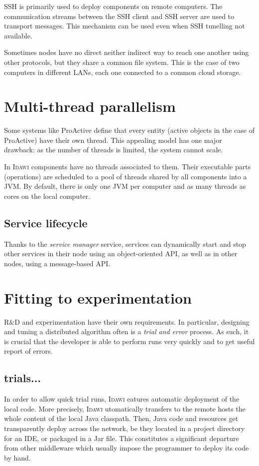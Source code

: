 \documentclass{article}
\newcommand{\idawi}[1]{\textsc{Idawi}\xspace}
\begin{document}
SSH
is primarily used to deploy components on remote computers. The communication streams between the SSH client and SSH server are used to transport messages. This mechanism can be used even when SSH tunelling not available.

Sometimes nodes have no direct neither indirect way to reach one another using other protocols, but they share a common file system. This is the case of two computers in different LANs, each one connected to a common cloud storage.


\section{Multi-thread parallelism}
Some systems like ProActive define that every entity (active objects in the case of ProActive) have their own thread. This appealing model has one major drawback: as the number of threads is limited, the system cannot scale.

In \idawi, components have no threads associated to them. Their executable parts (operations) are scheduled to a pool of threads shared by all components into a JVM. By default, there is only one JVM per computer and as many threads as cores on the local computer.

\subsection{Service lifecycle}

Thanks to the \textit{service manager} service, services can dynamically start and stop other services in their node using an object-oriented API, as well as in other nodes, using a message-based API. 



\section{Fitting to experimentation}
R\&D and experimentation have their own requirements. In particular, designing and tuning a distributed algorithm often is a {\em trial and error} process. As such, it is crucial that the developer is able to perform runs very quickly and to get useful report of errors. 

\subsection{trials...}
In order to allow quick trial runs, \idawi features automatic deployment of the local code.  More precisely, \idawi automatically transfers to the remote hosts the whole content of the local Java classpath. Then, Java code and resources get  transparently deploy across the network, be they located in a project directory for an IDE, or packaged in a Jar file. This constitutes a significant departure from other middleware which usually impose the programmer to deploy its code by hand. 
\end{document}

